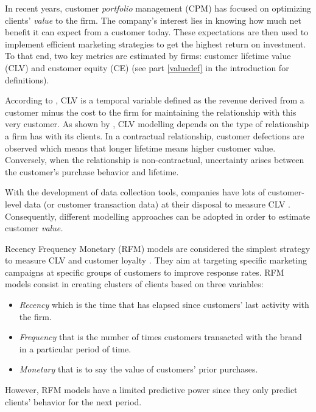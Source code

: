 \documentclass[
]{book}
\providecommand{\tightlist}{%
  \setlength{\itemsep}{0pt}\setlength{\parskip}{0pt}}
\begin{document}
In recent years, customer \emph{portfolio} management (CPM) has focused on optimizing clients' \emph{value} to the firm. The company's interest lies in knowing how much net benefit it can expect from a customer today. These expectations are then used to implement efficient marketing strategies to get the highest return on investment. To that end, two key metrics are estimated by firms: customer lifetime value (CLV) and customer equity (CE) (see part \ref{valuedef} in the introduction for definitions).

According to \citet{CLV_DEF}, CLV is a temporal variable defined as the revenue derived from a customer minus the cost to the firm for maintaining the relationship with this very customer. As shown by \citet{CLV_CONTEXT}, CLV modelling depends on the type of relationship a firm has with its clients. In a contractual relationship, customer defections are observed which means that longer lifetime means higher customer value. Conversely, when the relationship is non-contractual, uncertainty arises between the customer's purchase behavior and lifetime.

With the development of data collection tools, companies have lots of customer-level data (or customer transaction data) at their disposal to measure CLV \citep{CLV_NBD}. Consequently, different modelling approaches can be adopted in order to estimate customer \emph{value.}

Recency Frequency Monetary (RFM) models are considered the simplest strategy to measure CLV and customer loyalty \citep{CLV}. They aim at targeting specific marketing campaigns at specific groups of customers to improve response rates. RFM models consist in creating clusters of clients based on three variables:

\begin{itemize}
\tightlist
\item
  \emph{Recency} which is the time that has elapsed since customers' last activity with the firm.
\item
  \emph{Frequency} that is the number of times customers transacted with the brand in a particular period of time.
\item
  \emph{Monetary} that is to say the value of customers' prior purchases.
\end{itemize}

However, RFM models have a limited predictive power since they only predict clients' behavior for the next period.
\end{document}
